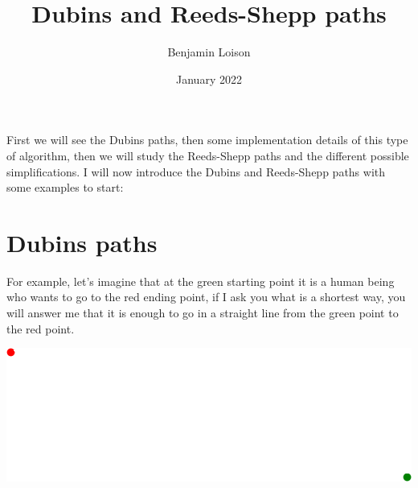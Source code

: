 \documentclass[11pt,a4paper]{article}
\begin{document}
	\title{\vspace*{-1.5cm}Dubins and Reeds-Shepp paths\vspace{-0.5cm}}
	\author{Benjamin Loison}
	\date{\vspace*{-0.25cm}January 2022}
	
	\maketitle

	\setlength{\parindent}{0cm}
	
	\vspace*{-0.5cm}
	
	First we will see the Dubins paths, then some implementation details of this type of algorithm, then we will study the Reeds-Shepp paths and the different possible simplifications.
	I will now introduce the Dubins and Reeds-Shepp paths with some examples to start:
	
	\section{Dubins paths}
	
	\begin{minipage}{0.8\textwidth}
	\raggedright
	For example, let's imagine that at the green starting point it is a human being who wants to go to the red ending point, if I ask you what is a shortest way, you will answer me that it is enough to go in a straight line from the green point to the red point.
	\end{minipage}
	\begin{minipage}{0.2\textwidth}
	\includegraphics[width=\linewidth]{Illustrations/humanSummary.png}
	\end{minipage}\\
	
\end{document}
